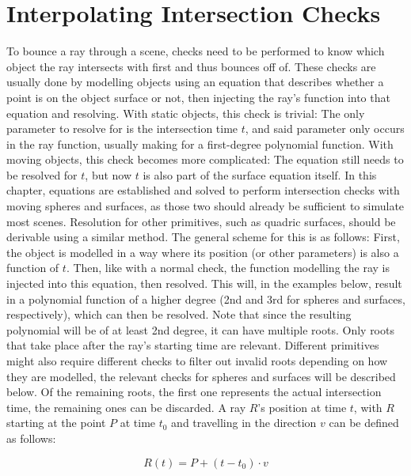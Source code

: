 \chapter{Interpolating Intersection Checks}

To bounce a ray through a scene, checks need to be performed to know which object the ray intersects with first and thus bounces off of.
These checks are usually done by modelling objects using an equation that describes whether a point is on the object surface or not,
then injecting the ray's function into that equation and resolving.
With static objects, this check is trivial:
The only parameter to resolve for is the intersection time \(t\), and said parameter only occurs in the ray function,
usually making for a first-degree polynomial function.
\newline
With moving objects, this check becomes more complicated: The equation still needs to be resolved for \(t\),
but now \(t\) is also part of the surface equation itself.
In this chapter, equations are established and solved to perform intersection checks with moving spheres and surfaces,
as those two should already be sufficient to simulate most scenes.
Resolution for other primitives, such as quadric surfaces, should be derivable using a similar method.
\newline
The general scheme for this is as follows:
First, the object is modelled in a way where its position (or other parameters) is also a function of \(t\).
Then, like with a normal check, the function modelling the ray is injected into this equation,
then resolved. This will, in the examples below, result in a polynomial function of a higher degree
(2nd and 3rd for spheres and surfaces, respectively), which can then be resolved.
Note that since the resulting polynomial will be of at least 2nd degree, it can have multiple roots.
Only roots that take place after the ray's starting time are relevant.
Different primitives might also require different checks to filter out invalid roots depending on how they are modelled,
the relevant checks for spheres and surfaces will be described below.
Of the remaining roots, the first one represents the actual intersection time, the remaining ones can be discarded.
\newline
A ray \(R\)'s position at time \(t\), with \(R\) starting at the point \(P\) at time \(t_0\) and travelling in the direction \(v\) can be defined as follows:

\begin{equation}\label{RayEq}
    R(t) = P + (t - t_0) \cdot v
\end{equation}


